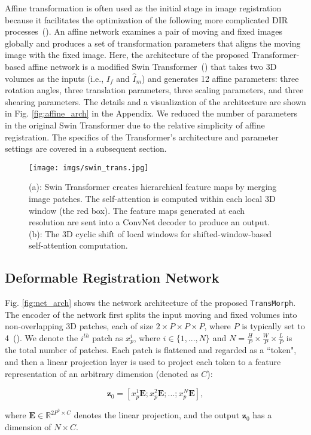 \documentclass[times,twocolumn,final]{elsarticle}
\begin{document}
Affine transformation is often used as the initial stage in image registration because it facilitates the optimization of the following more complicated DIR processes~(\cite{de2019deep}). An affine network examines a pair of moving and fixed images globally and produces a set of transformation parameters that aligns the moving image with the fixed image. Here, the architecture of the proposed Transformer-based affine network is a modified Swin Transformer~(\cite{liu2021swin}) that takes two 3D volumes as the inputs (i.e., $I_f$ and $\hat{I}_m$) and generates 12 affine parameters: three rotation angles, three translation parameters, three scaling parameters, and three shearing parameters. The details and a visualization of the architecture are shown in Fig. \ref{fig:affine_arch} in the Appendix. We reduced the number of parameters in the original Swin Transformer due to the relative simplicity of affine registration. The specifics of the Transformer's architecture and parameter settings are covered in a subsequent section.
\begin{figure*}[!h]
\centering
\texttt{[image: imgs/swin\_trans.jpg]}
\caption{(a): Swin Transformer creates hierarchical feature maps by merging image patches. The self-attention is computed within each local 3D window (the red box). The feature maps generated at each resolution are sent into a ConvNet decoder to produce an output. (b): The 3D cyclic shift of local windows for shifted-window-based self-attention computation. \label{fig:swin_feat}}
\end{figure*}
\subsection{Deformable Registration Network}
\label{sec:reg_net}
Fig. \ref{fig:net_arch} shows the network architecture of the proposed \texttt{TransMorph}. The encoder of the network first splits the input moving and fixed volumes into non-overlapping 3D patches, each of size $2\times P\times P\times P$, where $P$ is typically set to 4~(\cite{dosovitskiy2020image,liu2021swin,dong2021cswin}). We denote the $i^{th}$ patch as $x_p^i$, where $i\in\{1,...,N\}$ and $N=\frac{H}{P}\times\frac{W}{P}\times\frac{L}{P}$ is the total number of patches. Each patch is flattened and regarded as a ``token", and then a linear projection layer is used to project each token to a feature representation of an arbitrary dimension (denoted as $C$):
\begin{linenomath}
\begin{equation}
\label{eqn:embding}
    \mathbf{z}_0 = [x_p^1\mathbf{E};x_p^2\mathbf{E};...;x_p^N\mathbf{E}],
\end{equation}
\end{linenomath}
where $\mathbf{E}\in\mathbb{R}^{2P^3\times C}$ denotes the linear projection, and the output $\mathbf{z}_0$ has a dimension of $N\times C$. 
\end{document}
